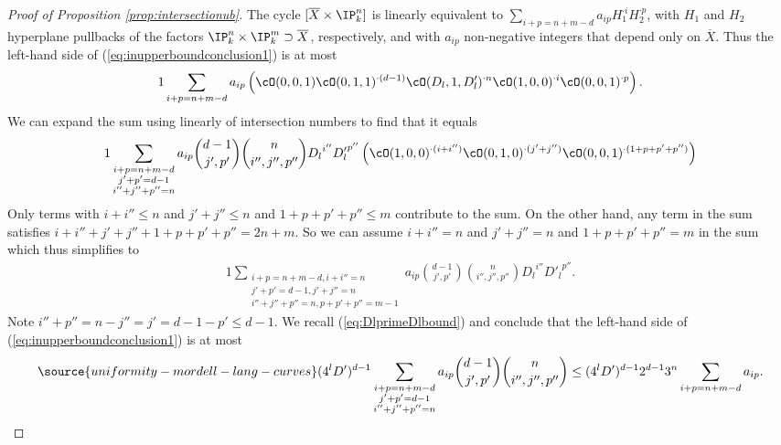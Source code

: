 \begin{proof}[Proof of Proposition \ref{prop:intersectionub}]
The cycle $[\overline X\times\IP_k^n]$ is linearly equivalent to
$\sum_{i+p=n+m-d} a_{ip}H_1^{\cdot i}  H_2^{\cdot p}$, with $H_{1}$ and $H_2$
hyperplane pullbacks of the factors $\IP_k^n\times \IP_k^m\supset
\overline X$, respectively, and with
$a_{ip}$ non-negative integers that depend only on $\overline X$.
Thus the left-hand side of (\ref{eq:inupperboundconclusion1}) is at
most %
\begin{alignat*}1
\sum_{i+p = n+m-d} a_{ip}
\left(  \cO(0,0,1)\cO(0,1,1)^{\cdot (d-1)}
\cO(D_l,1,D'_l)^{\cdot n}\cO(1,0,0)^{\cdot i}\cO(0,0,1)^{\cdot p}\right).
\end{alignat*}
We can expand the sum using linearly of intersection
numbers to find that it equals
\begin{alignat*}1
  \sum_{\substack{i+p=n+m-d\\ j'+p'=d-1\\i''+j''+p'' = n}} a_{ip} {d-1 \choose j',p'}
  {n\choose i'',j'',p''}{D_l}^{i''} {D'_l}^{p''} \left(\cO(1,0,0)^{\cdot
    (i+i'')} \cO(0,1,0)^{\cdot (j'+j'')}\cO(0,0,1)^{\cdot(1+p+p'+p'')}\right)
\end{alignat*}
Only terms with $i+i''\le n$ and $j'+j''\le n$ and $1+p+p'+p''\le m$
contribute to the sum.
On the other hand, any term in the sum satisfies
$i+i'' + j'+j'' + 1+p+p'+p'' =2n+m$.
So we can assume $i+i''=n$ and $j'+j''=n$ and $1+p+p'+p''=m$ in the
sum
which thus simplifies to
\begin{alignat*}1
  \sum_{\substack{i+p=n+m-d, i+i''=n \\ j'+p'=d-1,j'+j''=n \\ i''+j''+p''=n,p+p'+p''=m-1}} a_{ip} {d-1\choose
    j',p'} {n\choose i'',j'',p''} {D_l}^{i''} {D'_l}^{p''}.
\end{alignat*}
Note $i''+p''  = n-j'' =j'  = d-1-p'\le d-1$.
We recall (\ref{eq:DlprimeDlbound}) and conclude that the
 left-hand side of (\ref{eq:inupperboundconclusion1}) is at most
\begin{equation}
  \label{eq:intersectionnumberub2}
\source{uniformity-mordell-lang-curves}
  (4^lD')^{d-1}
  \sum_{\substack{i+p=n+m-d\\ j'+p'=d-1\\i''+j''+p'' = n}}
 a_{ip}
 {d-1\choose
    j',p'} {n\choose i'',j'',p''}
\le
 (4^l D')^{d-1}2^{d-1}3^n \sum_{\substack{i+p=n+m-d}}
 a_{ip}.
\end{equation}



\end{proof}
